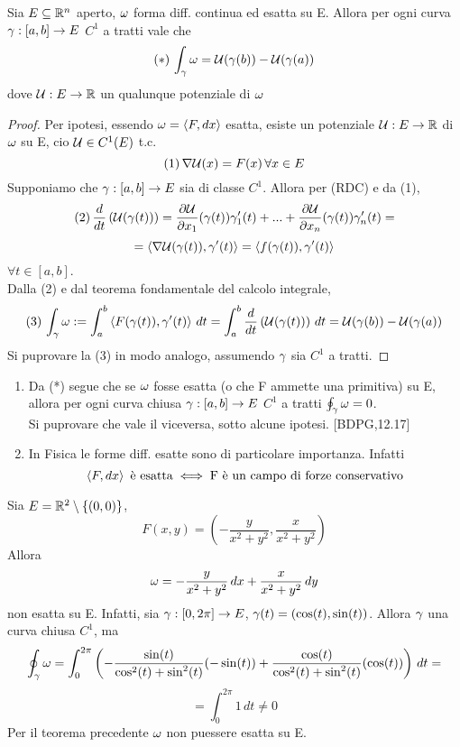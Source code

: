\begin{theorem}
  Sia $E \subseteq \mathbb{R}^n$ aperto, $\omega$ forma diff. continua ed esatta su E. Allora per ogni
  curva $\gamma:[a,b]\to E$ $C^1$ a tratti vale che 
  $$(*)\, \int_{\gamma}\omega = \mathcal{U}(\gamma(b))-\mathcal{U}(\gamma(a))$$
  dove $\mathcal{U}:E\to\mathbb{R}$ \ace un qualunque potenziale di $\omega$
  \begin{proof}
    Per ipotesi, essendo $\omega = \left\langle F,dx \right\rangle$ esatta, esiste un potenziale $\mathcal{U}:E\to\mathbb{R}$ di $\omega$ su E, cio\ace
    $\mathcal{U} \in C^1(E)$ t.c.
    $$(1) \, \nabla\mathcal{U}(x) = F(x) \, \forall x \in E$$
    Supponiamo che $\gamma:[a,b] \to E$ sia di classe $C^1$. Allora per (RDC) e da (1), 
    $$(2) \, \frac{d}{dt}\left(\mathcal{U}(\gamma(t))\right) = \frac{\partial \mathcal{U}}{\partial x_1}(\gamma(t)) \gamma_1'(t) + ... + 
              \frac{\partial \mathcal{U}}{\partial x_n}(\gamma(t)) \gamma_n'(t) = $$
    $$ = \left\langle \nabla\mathcal{U}(\gamma(t)),\gamma'(t) \right\rangle = \left\langle f(\gamma(t)),\gamma'(t) \right\rangle$$
    $\forall t \in [a,b]$. \\
    Dalla (2) e dal teorema fondamentale del calcolo integrale, 
    $$(3) \, \int_{\gamma} \omega := \int_{a}^{b} \left\langle F(\gamma(t)), \gamma'(t) \right\rangle \, dt = 
            \int_{a}^{b} \frac{d}{dt}\left(\mathcal{U}(\gamma(t))\right)\,dt = \mathcal{U}(\gamma(b)) - \mathcal{U}(\gamma(a))$$
    Si pu\aco provare la (3) in modo analogo, assumendo $\gamma$ sia $C^1$ a tratti.
  \end{proof}
\end{theorem}
\begin{osservazione}
  \begin{enumerate}
    \item Da (*) segue che se $\omega$ fosse esatta (o che F ammette una primitiva) su E, allora
          per ogni curva chiusa $\gamma:[a,b] \to E$ $C^1$ a tratti $\oint_{\gamma}\omega = 0$. \\
          Si pu\aco provare che vale il viceversa, sotto alcune ipotesi. [BDPG,12.17]
    \item In Fisica le forme diff. esatte sono di particolare importanza. Infatti
          $$\left\langle F,dx \right\rangle \text{ \`e esatta} \iff \text{F \`e un campo di forze conservativo}$$
  \end{enumerate}
\end{osservazione}
\begin{example}
  Sia $E = \mathbb{R}^2 \setminus \{(0,0)\}$, $$F(x,y)=\left(-\frac{y}{x^2+y^2}, \frac{x}{x^2+y^2}\right)$$
  Allora $$\omega = -\frac{y}{x^2+y^2}\,dx + \frac{x}{x^2+y^2}\,dy$$
  non \ace esatta su E. Infatti, sia $\gamma:[0,2\pi] \to E$, 
  $\gamma(t) = (\cos(t),\sin(t))$. Allora $\gamma$ \ace una curva chiusa $C^1$, ma 
  $$\oint_{\gamma}\omega = \int_{0}^{2\pi} \left(-\frac{\sin(t)}{\cos^2(t)+\sin^2(t)} (-\sin(t))+ 
                           \frac{\cos(t)}{\cos^2(t)+\sin^2(t)} (\cos(t))\right) \, dt = $$
                    $$= \int_{0}^{2\pi} 1 \,dt \neq 0$$
  Per il teorema precedente $\omega$ non pu\aco essere esatta su E.
\end{example}
